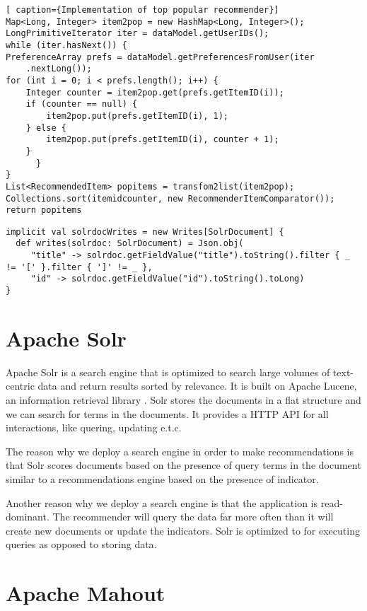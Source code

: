 \begin{lstlisting}[ caption={Implementation of top popular recommender}]
Map<Long, Integer> item2pop = new HashMap<Long, Integer>();
LongPrimitiveIterator iter = dataModel.getUserIDs();
while (iter.hasNext()) {
PreferenceArray prefs = dataModel.getPreferencesFromUser(iter
	.nextLong());
for (int i = 0; i < prefs.length(); i++) {
	Integer counter = item2pop.get(prefs.getItemID(i));
	if (counter == null) {
		item2pop.put(prefs.getItemID(i), 1);
	} else {
		item2pop.put(prefs.getItemID(i), counter + 1);
	}
      }
}
List<RecommendedItem> popitems = transfom2list(item2pop);
Collections.sort(itemidcounter, new RecommenderItemComparator()); 
return popitems
\end{lstlisting}


\begin{lstlisting}[caption={To transform SolrDocument to JSON Object we define a implicit definition of Writes[SolrDocment].}, label={lst:writes}]
implicit val solrdocWrites = new Writes[SolrDocument] {
  def writes(solrdoc: SolrDocument) = Json.obj(
     "title" -> solrdoc.getFieldValue("title").toString().filter { _ != '[' }.filter { ']' != _ },
     "id" -> solrdoc.getFieldValue("id").toString().toLong)
}  
\end{lstlisting}

\section{Apache Solr}
\label{sec:solr}

Apache Solr is a search engine that is optimized to search large volumes of text-centric data and return results sorted by relevance. It is built on Apache Lucene, an information retrieval library \cite{grainger}. Solr stores the documents in a flat structure and we can search for terms in the documents. It provides a HTTP API for all interactions, like quering, updating e.t.c.

The reason why we deploy a search engine in order to make recommendations is that Solr scores documents based on the presence of query terms in the document similar to a recommendations engine based on the presence of indicator.

Another reason why we deploy a search engine is that the application is read-dominant. The recommender will query the data far more often than it will create new documents or update the indicators. Solr is optimized to for executing queries as opposed to storing data.

\section{Apache Mahout}
\label{sec:mahout}

